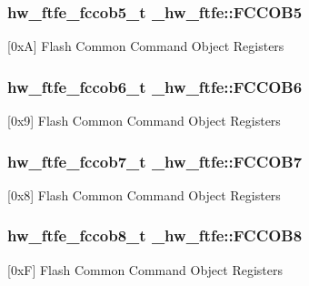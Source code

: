 \subsubsection[{\texorpdfstring{F\+C\+C\+O\+B5}{FCCOB5}}]{ {\bf hw\+\_\+ftfe\+\_\+fccob5\+\_\+t} \+\_\+hw\+\_\+ftfe\+::\+F\+C\+C\+O\+B5}\hypertarget{struct__hw__ftfe_ab8076c90345ca3a9df049465aff88696}{}\label{struct__hw__ftfe_ab8076c90345ca3a9df049465aff88696}
\mbox{[}0xA\mbox{]} Flash Common Command Object Registers 
\subsubsection[{\texorpdfstring{F\+C\+C\+O\+B6}{FCCOB6}}]{ {\bf hw\+\_\+ftfe\+\_\+fccob6\+\_\+t} \+\_\+hw\+\_\+ftfe\+::\+F\+C\+C\+O\+B6}\hypertarget{struct__hw__ftfe_a96cfd8ffb267a7ff28e683419d1068de}{}\label{struct__hw__ftfe_a96cfd8ffb267a7ff28e683419d1068de}
\mbox{[}0x9\mbox{]} Flash Common Command Object Registers 
\subsubsection[{\texorpdfstring{F\+C\+C\+O\+B7}{FCCOB7}}]{ {\bf hw\+\_\+ftfe\+\_\+fccob7\+\_\+t} \+\_\+hw\+\_\+ftfe\+::\+F\+C\+C\+O\+B7}\hypertarget{struct__hw__ftfe_a68f0ebd33a719675aad28313d13dd7bb}{}\label{struct__hw__ftfe_a68f0ebd33a719675aad28313d13dd7bb}
\mbox{[}0x8\mbox{]} Flash Common Command Object Registers 
\subsubsection[{\texorpdfstring{F\+C\+C\+O\+B8}{FCCOB8}}]{ {\bf hw\+\_\+ftfe\+\_\+fccob8\+\_\+t} \+\_\+hw\+\_\+ftfe\+::\+F\+C\+C\+O\+B8}\hypertarget{struct__hw__ftfe_a6000199b610ac76c21ba4e709fff1c68}{}\label{struct__hw__ftfe_a6000199b610ac76c21ba4e709fff1c68}
\mbox{[}0xF\mbox{]} Flash Common Command Object Registers 
